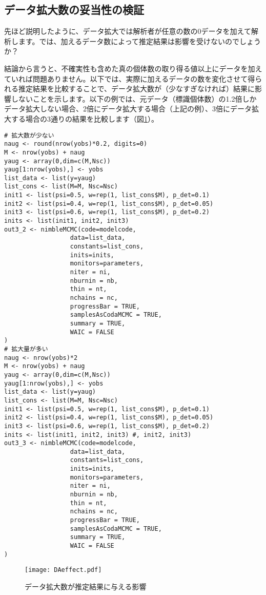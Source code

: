 \subsection{データ拡大数の妥当性の検証}
先ほど説明したように、データ拡大では解析者が任意の数の0データを加えて解析します。では、加えるデータ数によって推定結果は影響を受けないのでしょうか？

結論から言うと、不確実性も含めた真の個体数の取り得る値以上にデータを加えていれば問題ありません。以下では、実際に加えるデータの数を変化させて得られる推定結果を比較することで、データ拡大数が（少なすぎなければ）結果に影響しないことを示します。以下の例では、元データ（標識個体数）の1.2倍しかデータ拡大しない場合、2倍にデータ拡大する場合（上記の例）、3倍にデータ拡大する場合の3通りの結果を比較します（図\ref{DAeffect}）。

\begin{verbatim}
# 拡大数が少ない
naug <- round(nrow(yobs)*0.2, digits=0)
M <- nrow(yobs) + naug
yaug <- array(0,dim=c(M,Nsc))
yaug[1:nrow(yobs),] <- yobs
list_data <- list(y=yaug)
list_cons <- list(M=M, Nsc=Nsc)
init1 <- list(psi=0.5, w=rep(1, list_cons$M), p_det=0.1)
init2 <- list(psi=0.4, w=rep(1, list_cons$M), p_det=0.05)
init3 <- list(psi=0.6, w=rep(1, list_cons$M), p_det=0.2)
inits <- list(init1, init2, init3)
out3_2 <- nimbleMCMC(code=modelcode,
                  data=list_data,
                  constants=list_cons,
                  inits=inits,
                  monitors=parameters,
                  niter = ni,
                  nburnin = nb,
                  thin = nt,
                  nchains = nc,
                  progressBar = TRUE,
                  samplesAsCodaMCMC = TRUE,
                  summary = TRUE,
                  WAIC = FALSE
)
# 拡大量が多い
naug <- nrow(yobs)*2
M <- nrow(yobs) + naug
yaug <- array(0,dim=c(M,Nsc))
yaug[1:nrow(yobs),] <- yobs
list_data <- list(y=yaug)
list_cons <- list(M=M, Nsc=Nsc)
init1 <- list(psi=0.5, w=rep(1, list_cons$M), p_det=0.1)
init2 <- list(psi=0.4, w=rep(1, list_cons$M), p_det=0.05)
init3 <- list(psi=0.6, w=rep(1, list_cons$M), p_det=0.2)
inits <- list(init1, init2, init3) #, init2, init3)
out3_3 <- nimbleMCMC(code=modelcode,
                  data=list_data,
                  constants=list_cons,
                  inits=inits,
                  monitors=parameters,
                  niter = ni,
                  nburnin = nb,
                  thin = nt,
                  nchains = nc,
                  progressBar = TRUE,
                  samplesAsCodaMCMC = TRUE,
                  summary = TRUE,
                  WAIC = FALSE
)
\end{verbatim}
\begin{figure}[htb]
\begin{center}
\graphicspath{{4_hm/figs/}}
\texttt{[image: DAeffect.pdf]}\\
\caption{データ拡大数が推定結果に与える影響}
\label{DAeffect}
\end{center}
\end{figure}

